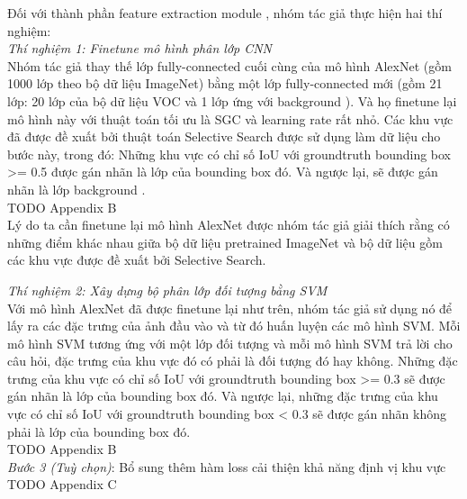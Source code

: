 {    \noindent
    Đối với thành phần feature extraction module , nhóm tác giả thực hiện hai thí nghiệm: \\
    \textit{Thí nghiệm 1: Finetune mô hình phân lớp CNN} \\
    Nhóm tác giả thay thế lớp fully-connected cuối cùng của mô hình AlexNet (gồm 1000 lớp theo bộ dữ liệu ImageNet) bằng một lớp fully-connected mới (gồm 21 lớp: 20 lớp của bộ dữ liệu VOC và 1 lớp ứng với background ).
    Và họ finetune lại mô hình này với thuật toán tối ưu là SGC và learning rate rất nhỏ.
    Các khu vực đã được đề xuất bởi thuật toán Selective Search được sử dụng làm dữ liệu cho bước này, trong đó:
    Những khu vực có chỉ số IoU  với groundtruth  bounding box  >= 0.5 được gán nhãn là lớp của bounding box  đó.
    Và ngược lại, sẽ được gán nhãn là lớp background . \\
    TODO Appendix B \\
    Lý do ta cần finetune lại mô hình AlexNet được nhóm tác giả giải thích rằng có những điểm khác nhau giữa bộ dữ liệu pretrained ImageNet và bộ dữ liệu gồm các khu vực được đề xuất bởi Selective Search.

    \noindent
    \textit{Thí nghiệm 2: Xây dựng bộ phân lớp đối tượng  bằng SVM} \\
    Với mô hình AlexNet đã được finetune lại như trên, nhóm tác giả sử dụng nó để lấy ra các đặc trưng của ảnh đầu vào và từ đó huấn luyện các mô hình SVM.
    Mỗi mô hình SVM tương ứng với một lớp đối tượng  và mỗi mô hình SVM trả lời cho câu hỏi, đặc trưng của khu vực đó có phải là đối tượng đó hay không.
    Những đặc trưng của khu vực có chỉ số IoU  với groundtruth  bounding box  >= 0.3 sẽ được gán nhãn là lớp của bounding box  đó.
    Và ngược lại, những đặc trưng của khu vực có chỉ số IoU  với groundtruth  bounding box  < 0.3 sẽ được gán nhãn không phải là lớp của bounding box  đó. \\
    TODO Appendix B \\

    \textit{Bước 3 (Tuỳ chọn)}: Bổ sung thêm hàm loss cải thiện khả năng định vị khu vực \\
    TODO Appendix C \\

}
